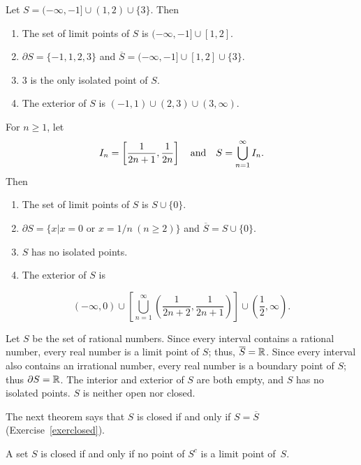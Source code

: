 \enlargethispage{\baselineskip}
\begin{exa}\label{example:1.3.7}  Let
$S=(-\infty,-1]\cup (1,2)\cup
\{3\}$. Then
  \begin{enumerate}
\item %
The set of limit points of $S$ is $(-\infty,-1]\cup
[1,2]$.
\item %
$\partial S=\{-1,1,2,3\}$ and $\overline{S}=
(-\infty,-1]\cup [1,2]\cup\{3\}$.
\item %
 $3$ is the only isolated point
of $S$.
\item %
 The exterior of $S$ is $(-1,1)\cup (2,3)\cup (3,\infty)$.
\end{enumerate}
\end{exa}

\begin{exa}\label{example:1.3.8} For $n\ge1$, let
$$
I_n=\left[\frac{1}{2n+1}, \frac{1}{2n}\right]\mbox{\quad and\quad}
S=
\bigcup^\infty_{n=1} I_n.
$$
Then
\begin{enumerate}
\item %
The set of limit points of $S$ is $S\cup\{0\}$.
\item %
$\partial S=
\{x|x=0 \mbox{ or } x=1/n\ (n\ge2)\}$ and
$\overline{S}=S\cup\{0\}$.
\item %
 $S$ has no isolated points.
\item %
 The exterior of $S$ is
\end{enumerate}
$$
(-\infty,0)\cup\left[\bigcup^\infty_{n=1}\left(\frac{1}{2n+2},\frac{1}
{2n+1}\right)\right]\cup\left(\frac{1}{2},\infty\right).
$$
\end{exa}

\begin{exa}\label{example:1.3.9}
Let $S$ be the set of rational numbers. Since every interval contains
a rational number, every real
number is a limit point of $S$; thus, $\overline{S}=\mathbb{R}$. Since
every interval also contains an irrational number, every real number is a
boundary
point of $S$; thus $\partial S=\mathbb{R}$.
 The interior and exterior of $S$ are both empty, and $S$
has no isolated points.
$S$ is neither open nor closed.
\end{exa}


The next theorem says that $S$ is closed if and only if $S=\overline{S}$
(Exercise~\ref{exerclosed}).

\begin{thm}\label{thmtype:1.3.5}   A set $S$ is closed if and only if
no point of $S^c$ is a limit point of~$S.$
\end{thm}

